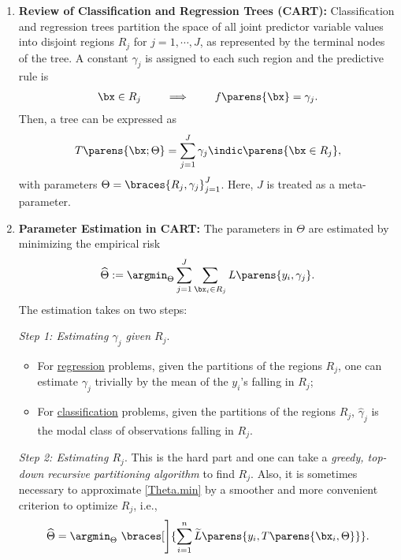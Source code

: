 \documentclass[12pt]{article}
\begin{document}
\begin{enumerate}[label=\textbf{\arabic*.}]

	\item \textbf{Review of Classification and Regression Trees (CART):} Classification and regression trees partition the space of all joint predictor variable values into disjoint regions $R_j$ for $j = 1, \cdots, J$, as represented by the terminal nodes of the tree. A constant $\gamma_j$ is assigned to each such region and the predictive rule is 
	\begin{align*}
		\bx \in R_j \hspace{20pt} \implies \hspace{20pt} f \parens{\bx} = \gamma_j. 
	\end{align*}
	Then, a tree can be expressed as 
	\begin{align*}
		T \parens{\bx; \Theta} = \sum_{j=1}^J \gamma_j \indic \parens{\bx \in R_j}, 
	\end{align*}
	with parameters $\Theta = \braces{R_j, \gamma_j}_{j=1}^J$. Here, $J$ is treated as a meta-parameter. 
	
	\item \textbf{Parameter Estimation in CART:} The parameters in $\Theta$ are estimated by minimizing the empirical risk 
	\begin{align}\label{Theta.min}
		\widehat{\Theta} := \argmin_{\Theta} \sum_{j=1}^J \sum_{\bx_i \in R_j} L \parens{y_i, \gamma_j}. 
	\end{align}
	The estimation takes on two steps: 
	
	\textit{Step 1: Estimating $\gamma_j$ given $R_j$}. 
	\begin{itemize}
		\item For \underline{regression} problems, given the partitions of the regions $R_j$, one can estimate $\gamma_j$ trivially by the mean of the $y_i$'s falling in $R_j$; 
		\item For \underline{classification} problems, given the partitions of the regions $R_j$, $\hat{\gamma}_j$ is the modal class of observations falling in $R_j$. 
	\end{itemize}
	
	\textit{Step 2: Estimating $R_j$}. This is the hard part and one can take a \emph{greedy, top-down recursive partitioning algorithm} to find $R_j$. Also, it is sometimes necessary to approximate \eqref{Theta.min} by a smoother and more convenient criterion to optimize $R_j$, i.e., 
	\begin{align*}
		\widehat{\Theta} = \argmin_{\Theta} \ \braces[\Bigg]{\sum_{i=1}^n \widetilde{L} \parens{y_i, T \parens{\bx_i, \Theta}}}. 
	\end{align*}
	

\end{enumerate}
\end{document}
